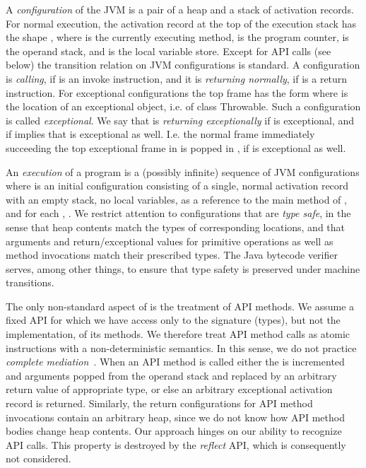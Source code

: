 \documentclass[10pt,twocolumn]{article}
\begin{document}
A \emph{configuration} of the JVM is a pair  of a heap  and a stack  of activation records. For normal execution, the activation record at the top of the execution stack has the shape , where  is the currently executing method,  is the program counter,  is the operand stack, and  is the local variable store. Except for API calls (see below) the transition relation  on JVM configurations is standard. A configuration  is {\em calling}, if  is an invoke instruction, and it is {\em returning normally}, if  is a return instruction. For exceptional configurations the top frame has the form  where  is the location of an exceptional object, i.e. of class Throwable. Such a configuration is called {\em exceptional}. We say that  is {\em returning exceptionally} if  is exceptional, and if  implies that  is exceptional as well. I.e. the normal frame immediately succeeding the top exceptional frame in  is popped in , if  is exceptional as well.

An \emph{execution}  of a program  is a (possibly infinite) sequence of JVM configurations  where  is an initial configuration consisting of a single, normal activation record with an empty stack, no local variables,  as a reference to the main method of ,  and for each , . We restrict attention to configurations that are \emph{type safe}, in the sense that heap contents match the types of corresponding locations, and that arguments and return/exceptional values for primitive operations as well as method invocations match their prescribed types. The Java bytecode verifier serves, among other things, to ensure that type safety is preserved under machine transitions.

The only non-standard aspect of  is the treatment of API methods. We assume a fixed API for which we have access only to the signature (types), but not the implementation, of its methods. We therefore treat API method calls as atomic instructions with a non-deterministic semantics. In this sense, we do not practice \emph{complete mediation}~\cite{saltzer75}. When an API method is called either the  is incremented and arguments popped from the operand stack and replaced by an arbitrary return value of appropriate type, or else an arbitrary exceptional activation record is returned. Similarly, 
the return configurations for API method invocations contain an arbitrary heap, since we do not know how API method bodies change heap contents. Our approach hinges on our ability to recognize API calls. This property is destroyed by the \emph{reflect} API, which is consequently not considered.
\end{document}

